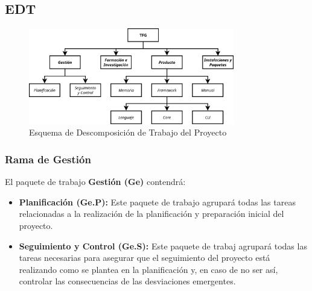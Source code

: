 








\subsection{EDT}\label{subsec:edt}

\begin{figure}[H]
    \centering
    \includegraphics[width=0.8\textwidth]{5-Cuerpo/Chapter1/EDT.png}
    \caption{Esquema de Descomposición de Trabajo del Proyecto}
    \label{fig:EDT}
\end{figure}

\subsubsection{Rama de Gestión}
El paquete de trabajo \textbf{Gestión (Ge)} contendrá:
\begin{itemize}
    \item \textbf{Planificación (Ge.P):} Este paquete de trabajo agrupará todas
    las tareas relacionadas a la realización de la planificación y preparación
    inicial del proyecto.
    \item \textbf{Seguimiento y Control (Ge.S):} Este paquete de trabaj agrupará
    todas las tareas necesarias para asegurar que el seguimiento del proyecto
    está realizando como se plantea en la planificación y, en caso de no ser
    así, controlar las consecuencias de las desviaciones emergentes.
\end{itemize}

